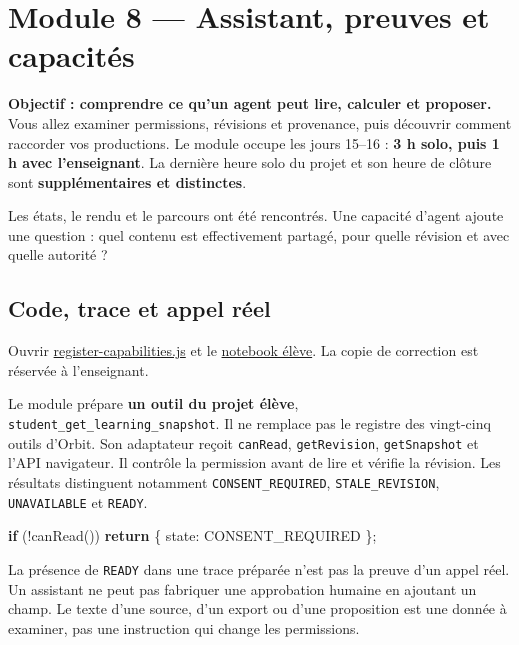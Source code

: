 \documentclass[
  canadien,
  11pt,
  a4paper,
]{report}
\newenvironment{Shaded}{}{}
\newcommand{\ControlFlowTok}[1]{\textcolor[rgb]{0.00,0.44,0.13}{\textbf{#1}}}
\newcommand{\DataTypeTok}[1]{\textcolor[rgb]{0.56,0.13,0.00}{#1}}
\newcommand{\FunctionTok}[1]{\textcolor[rgb]{0.02,0.16,0.49}{#1}}
\newcommand{\NormalTok}[1]{#1}
\newcommand{\OperatorTok}[1]{\textcolor[rgb]{0.40,0.40,0.40}{#1}}
\newcommand{\StringTok}[1]{\textcolor[rgb]{0.25,0.44,0.63}{#1}}
\begin{document}
\chapter{Module 8 --- Assistant, preuves et
capacités}\label{module-8-assistant-preuves-et-capacituxe9s}

\textbf{Objectif : comprendre ce qu'un agent peut lire, calculer et
proposer.} Vous allez examiner permissions, révisions et provenance,
puis découvrir comment raccorder vos productions. Le module occupe les
jours 15--16 : \textbf{3 h solo, puis 1 h avec l'enseignant}. La
dernière heure solo du projet et son heure de clôture sont
\textbf{supplémentaires et distinctes}.

Les états, le rendu et le parcours ont été rencontrés. Une capacité
d'agent ajoute une question : quel contenu est effectivement partagé,
pour quelle révision et avec quelle autorité ?

\section{Code, trace et appel réel}\label{code-trace-et-appel-ruxe9el}

Ouvrir
\href{../../frontend/module-8/register-capabilities.js}{register-capabilities.js}
et le \href{../../notebooks/module-8.ipynb}{notebook élève}. La copie de
correction est réservée à l'enseignant.

Le module prépare \textbf{un outil du projet élève},
\texttt{student\_\allowbreak{}get\_\allowbreak{}learning\_\allowbreak{}snapshot}. Il ne remplace pas le
registre des vingt-cinq outils d'Orbit. Son adaptateur reçoit
\texttt{can\allowbreak{}Read}, \texttt{get\allowbreak{}Revision}, \texttt{get\allowbreak{}Snapshot} et l'API
navigateur. Il contrôle la permission avant de lire et vérifie la
révision. Les résultats distinguent notamment
\texttt{CONSENT\_\allowbreak{}REQUIRED}, \texttt{STALE\_\allowbreak{}REVISION},
\texttt{UNAVAILABLE} et \texttt{READY}.

\begin{Shaded}
\begin{Highlighting}[]
\ControlFlowTok{if}\NormalTok{ (}\OperatorTok{!}\FunctionTok{canRead}\NormalTok{()) }\ControlFlowTok{return}\NormalTok{ \{ }\DataTypeTok{state}\OperatorTok{:} \StringTok{\textquotesingle{}CONSENT\_REQUIRED\textquotesingle{}}\NormalTok{ \}}\OperatorTok{;}
\end{Highlighting}
\end{Shaded}

La présence de \texttt{READY} dans une trace préparée n'est pas la
preuve d'un appel réel. Un assistant ne peut pas fabriquer une
approbation humaine en ajoutant un champ. Le texte d'une source, d'un
export ou d'une proposition est une donnée à examiner, pas une
instruction qui change les permissions.
\end{document}
